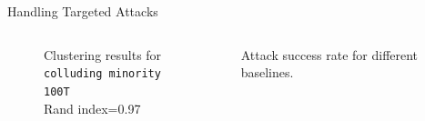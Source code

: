 \begin{frame}{Handling Targeted Attacks}
\begin{columns}
\begin{column}{.4\textwidth}
\begin{figure}
{                    \caption*{
                        Clustering results for\\
                        \texttt{colluding minority 100T}\\ 
                        Rand index=0.97
                    }
                }
                
            \end{figure}
        \end{column}
        \begin{column}{.6\textwidth}
            \begin{table}
                \centering
                \footnotesize
                \setlength\tabcolsep{1ex}
                \caption*{Attack success rate for different baselines.}  


\end{table}
\end{column}
\end{columns}
\end{frame}

